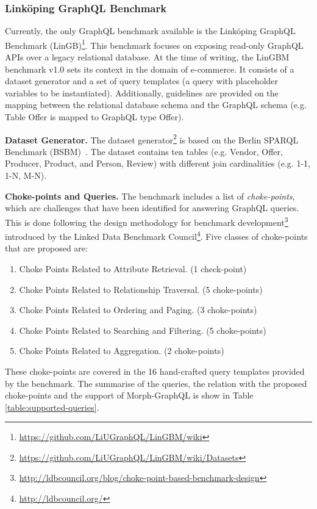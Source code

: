 \subsubsection{Link\"{o}ping GraphQL Benchmark} 
Currently, the only GraphQL benchmark available is the Link\"{o}ping GraphQL Benchmark (LinGB)\footnote{\url{https://github.com/LiUGraphQL/LinGBM/wiki}}. This benchmark focuses on exposing read-only GraphQL APIs over a legacy relational database. At the time of writing, the LinGBM benchmark v1.0 sets its context in the domain of e-commerce. It consists of a dataset generator and a set of query templates (a query with placeholder variables to be instantiated). Additionally, guidelines are provided on the mapping between the relational database schema and the GraphQL schema (e.g. Table Offer is mapped to GraphQL type Offer). 

\textbf{Dataset Generator.}
The dataset generator\footnote{\url{https://github.com/LiUGraphQL/LinGBM/wiki/Datasets}} is based on the Berlin SPARQL Benchmark (BSBM)~\citep{bizer2009berlin}. The dataset contains ten tables (e.g.  Vendor, Offer, Producer, Product, and Person, Review) with different join cardinalities (e.g. 1-1, 1-N, M-N).

\textbf{Choke-points and Queries.} 
The benchmark includes a list of \textit{choke-points}, which are challenges that have been identified for answering GraphQL queries. This is done following the design methodology for benchmark development\footnote{\url{http://ldbcouncil.org/blog/choke-point-based-benchmark-design}} introduced by the Linked Data Benchmark Council\footnote{\url{http://ldbcouncil.org/}}. Five classes of choke-points that are proposed are: 
\begin{enumerate}
    \item Choke Points Related to Attribute Retrieval. (1 check-point)
    \item Choke Points Related to Relationship Traversal. (5 choke-points)
    \item Choke Points Related to Ordering and Paging. (3 choke-points)
    \item Choke Points Related to Searching and Filtering. (5 choke-points)
    \item Choke Points Related to Aggregation. (2 choke-points)
\end{enumerate}

These choke-points are covered in the 16 hand-crafted query templates provided by the benchmark. The summarise of the queries, the relation with the proposed choke-points and the support of Morph-GraphQL is show in Table \ref{table:supported-queries}.


